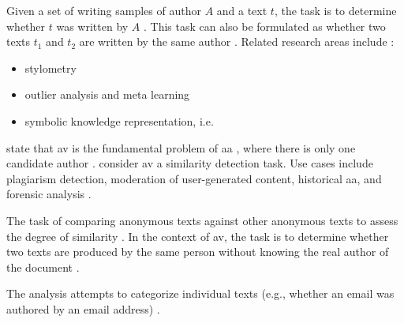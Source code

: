 \begin{definition}
    [\ac{av}]   %
    Given a set of writing samples of author $A$ and a text $t$,    %
    the task is to determine whether $t$ was written by $A$ \cite{stein_intrinsic_2011,stamatatos_survey_2009,koppel_authorship_2011,tyo_state_2022,kocher_unine_2015}.
    This task can also be formulated as whether two texts $t_1$ and $t_2$ are written by the same author 
    \cite{bevendorff_generalizing_2019,bevendorff_divergence_based_2020,embarcadero_ruiz_graph_based_2022,rivera_soto_learning_2021,ordonez_will_2020,futrzynski_pairwise_2021,weerasinghe_feature_vector_difference_2021}.
    Related research areas include \cite{stein_intrinsic_2011}:
    \begin{itemize}
        \item stylometry
        \item outlier analysis and meta learning
        \item symbolic knowledge representation, i.e. 
    \end{itemize}
    \citet{tyo_state_2022} state that \ac{av} is the fundamental problem of \ac{aa} \cite{tyo_state_2022}, 
    where there is only one candidate author \cite{barlas_cross_domain_2020}.
    \citet{elmanarelbouanani_authorship_2014} consider \ac{av} a similarity detection task.
    Use cases include plagiarism detection, moderation of user-generated content, historical \ac{aa}, and forensic analysis \cite{rivera_soto_learning_2021}.
\end{definition}

\begin{definition}
    The task of comparing anonymous texts against other anonymous texts to assess the degree of similarity \cite{abbasi_writeprints_2008}.
    In the context of \ac{av}, the task is to determine whether two texts are produced by the same person without knowing the real author of the document \cite{elmanarelbouanani_authorship_2014}.
\end{definition}

\begin{definition}
    The analysis attempts to categorize individual texts (e.g., whether an email was authored by an email address) \cite{abbasi_writeprints_2008}.
\end{definition}

